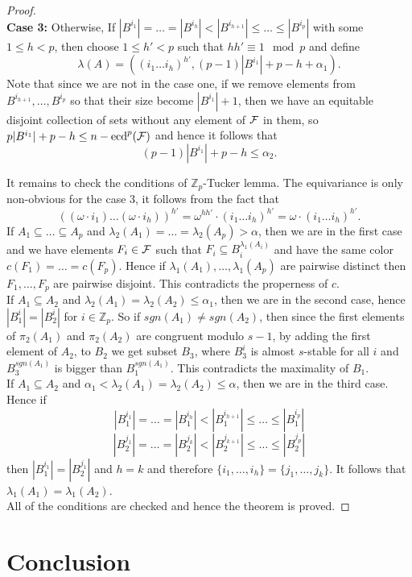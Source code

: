 \documentclass[a4paper,11pt]{article}
\begin{document}
\begin{proof}
\\
{\textbf{Case 3:}} Otherwise, If $|B^{i_1}|=\dots=|B^{i_h}|<|B^{i_{h+1}}|\le \dots\le |B^{i_p}|$ with some $1\le h<p$, then choose $1\le h'<p$ such that $hh'\equiv 1 \mod p$ and define
$$\lambda(A)=((i_1\dots i_h)^{h'}, (p-1)|B^{i_1}|+p-h+\alpha_1).$$
Note that since we are not in the case one, if we remove elements from $B^{i_{h+1}},\dots, B^{i_p}$ so that their size become $|B^{i_1}|+1$, then we have an equitable disjoint collection of sets without any element of $\cal F$ in them, so $p|B^{i_1}|+p-h\le n-\mbox{ecd}^p({\cal F})$ and hence it follows that
$$(p-1)|B^{i_1}|+p-h\le \alpha_2.$$

It remains to check the conditions of $\mathbb Z_p$-Tucker lemma. The equivariance is only non-obvious for the case 3, it follows from the fact that 
$$((\omega\cdot i_1)\dots (\omega\cdot i_h))^{h'}=\omega^{hh'}\cdot (i_1\dots i_h)^{h'}=\omega\cdot  (i_1\dots i_h)^{h'}.$$
If $A_1\subseteq \dots\subseteq A_p$ and $\lambda_2(A_1)=\dots=\lambda_2(A_p)>\alpha$, then we are in the first case and we have elements $F_i\in{\cal F}$ such that $F_i\subseteq B_i^{\lambda_1(A_i)}$ and have the same color $c(F_1)=\dots=c(F_p)$. Hence if $\lambda_1(A_1),\dots, \lambda_1(A_p)$ are pairwise distinct then $F_1,\dots, F_p$ are pairwise disjoint. This contradicts the properness of $c$.
\\
If $A_1\subseteq A_2$ and $\lambda_2(A_1)=\lambda_2(A_2)\le \alpha_1$, then we are in the second case, hence $|B_1^i|=|B_2^i|$ for $i\in \mathbb Z_p$. So if $sgn(A_1)\ne sgn(A_2)$, then since the first elements of $\pi_2(A_1)$ and $\pi_2(A_2)$ are congruent modulo $s-1$, by adding the first element of $A_2$, to $B_2$ we get subset $B_3$, where $B_3^i$ is almost $s$-stable for all $i$ and $B_3^{sgn(A_1)}$ is bigger than $B_1^{sgn(A_1)}$. This contradicts the maximality of $B_1$.
\\
If $A_1\subseteq A_2$ and $\alpha_1<\lambda_2(A_1)=\lambda_2(A_2)\le \alpha$, then we are in the third case. Hence if
$$|B_1^{i_1}|=\dots=|B_1^{i_h}|<|B_1^{i_{h+1}}|\le \dots\le |B_1^{i_p}|$$
$$|B_2^{j_1}|=\dots=|B_2^{j_k}|<|B_2^{j_{k+1}}|\le \dots\le |B_2^{j_p}|$$
then $|B_1^{i_1}|=|B_2^{j_1}|$ and $h=k$ and therefore $\{i_1,\dots, i_h\}=\{j_1,\dots, j_k\}$. It follows that $\lambda_1(A_1)=\lambda_1(A_2)$. 
\\
All of the conditions are checked and hence the theorem is proved.
\end{proof}

\section{Conclusion}
\end{document}
